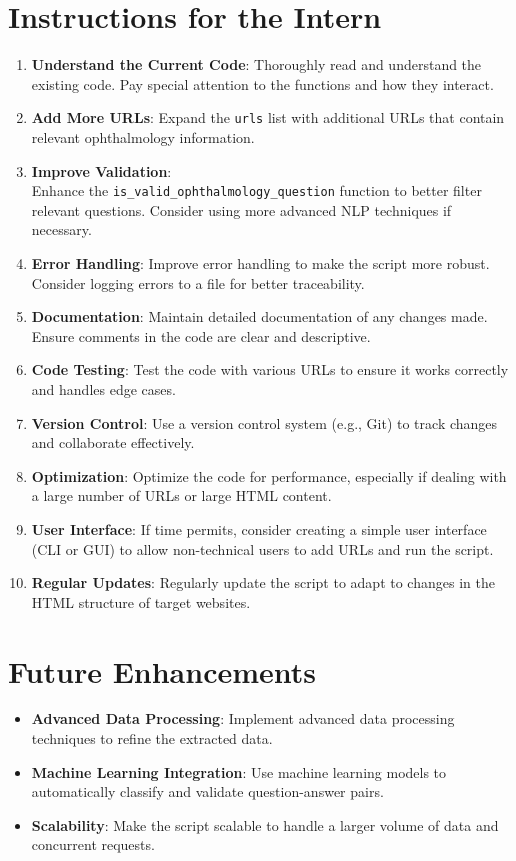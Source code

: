 \documentclass[a4paper,12pt]{article}
\begin{document}
\section{Instructions for the Intern}
\begin{enumerate}
    \item \textbf{Understand the Current Code}: Thoroughly read and understand the existing code. Pay special attention to the functions and how they interact.
    \item \textbf{Add More URLs}: Expand the \texttt{urls} list with additional URLs that contain relevant ophthalmology information.
    \item \textbf{Improve Validation}:\\
     Enhance the \texttt{is\_valid\_ophthalmology\_question} function to better filter relevant questions. Consider using more advanced NLP techniques if necessary.
    \item \textbf{Error Handling}: Improve error handling to make the script more robust. Consider logging errors to a file for better traceability.
    \item \textbf{Documentation}: Maintain detailed documentation of any changes made. Ensure comments in the code are clear and descriptive.
    \item \textbf{Code Testing}: Test the code with various URLs to ensure it works correctly and handles edge cases.
    \item \textbf{Version Control}: Use a version control system (e.g., Git) to track changes and collaborate effectively.
    \item \textbf{Optimization}: Optimize the code for performance, especially if dealing with a large number of URLs or large HTML content.
    \item \textbf{User Interface}: If time permits, consider creating a simple user interface (CLI or GUI) to allow non-technical users to add URLs and run the script.
    \item \textbf{Regular Updates}: Regularly update the script to adapt to changes in the HTML structure of target websites.
\end{enumerate}

\section{Future Enhancements}
\begin{itemize}
    \item \textbf{Advanced Data Processing}: Implement advanced data processing techniques to refine the extracted data.
    \item \textbf{Machine Learning Integration}: Use machine learning models to automatically classify and validate question-answer pairs.
    \item \textbf{Scalability}: Make the script scalable to handle a larger volume of data and concurrent requests.
\end{itemize}
\end{document}
